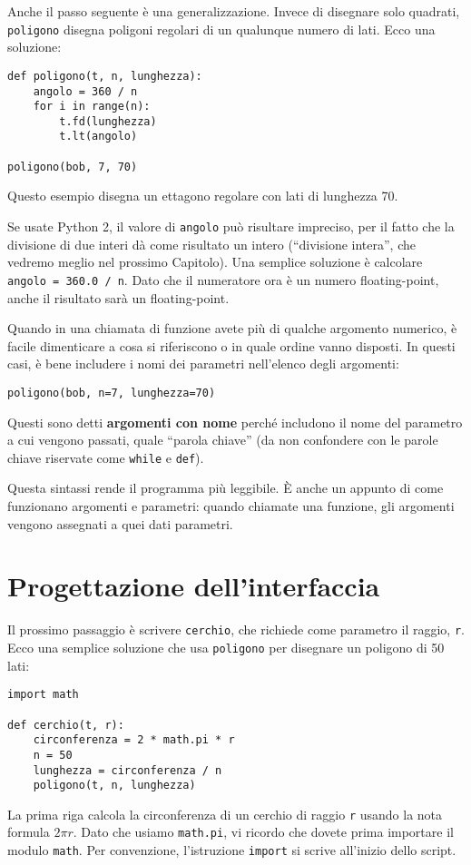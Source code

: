 \documentclass[10pt]{book}
\begin{document}
Anche il passo seguente è una generalizzazione. Invece di disegnare solo quadrati, {\tt poligono} disegna poligoni regolari di un qualunque numero di lati. Ecco una soluzione:

\begin{verbatim}
def poligono(t, n, lunghezza):
    angolo = 360 / n
    for i in range(n):
        t.fd(lunghezza)
        t.lt(angolo)

poligono(bob, 7, 70)
\end{verbatim}
%
Questo esempio disegna un ettagono regolare con lati di lunghezza 70. 

Se usate Python 2, il valore di {\tt angolo} può risultare impreciso, per il fatto che la divisione di due interi dà come risultato un intero (``divisione intera'', che vedremo meglio nel prossimo Capitolo). Una semplice soluzione è calcolare {\tt angolo = 360.0 / n}.  Dato che il numeratore ora è un numero floating-point, anche il risultato sarà un floating-point.

Quando in una chiamata di funzione avete più di qualche argomento numerico, è facile dimenticare a cosa si riferiscono o in quale ordine vanno disposti. In questi casi, è bene includere i nomi dei parametri nell'elenco degli argomenti:

\begin{verbatim}
poligono(bob, n=7, lunghezza=70)
\end{verbatim}
%
Questi sono detti {\bf argomenti con nome} perché includono il nome del parametro a cui vengono passati, quale ``parola chiave'' (da non confondere con le parole chiave riservate come {\tt while} e {\tt def}).

Questa sintassi rende il programma più leggibile. È anche un appunto di come funzionano argomenti e parametri: quando chiamate una funzione, gli argomenti vengono assegnati a quei dati parametri.


\section{Progettazione dell'interfaccia}

Il prossimo passaggio è scrivere {\tt cerchio}, che richiede come parametro il raggio, {\tt r}. Ecco una semplice soluzione che usa {\tt poligono} per disegnare un poligono di 50 lati:

\begin{verbatim}
import math

def cerchio(t, r):
    circonferenza = 2 * math.pi * r
    n = 50
    lunghezza = circonferenza / n
    poligono(t, n, lunghezza)
\end{verbatim}
%
La prima riga calcola la circonferenza di un cerchio di raggio
{\tt r} usando la nota formula $2 \pi r$. Dato che usiamo {\tt math.pi}, vi ricordo che dovete prima importare il modulo {\tt math}.  Per convenzione, l'istruzione {\tt import} si scrive all'inizio dello script.
\end{document}
